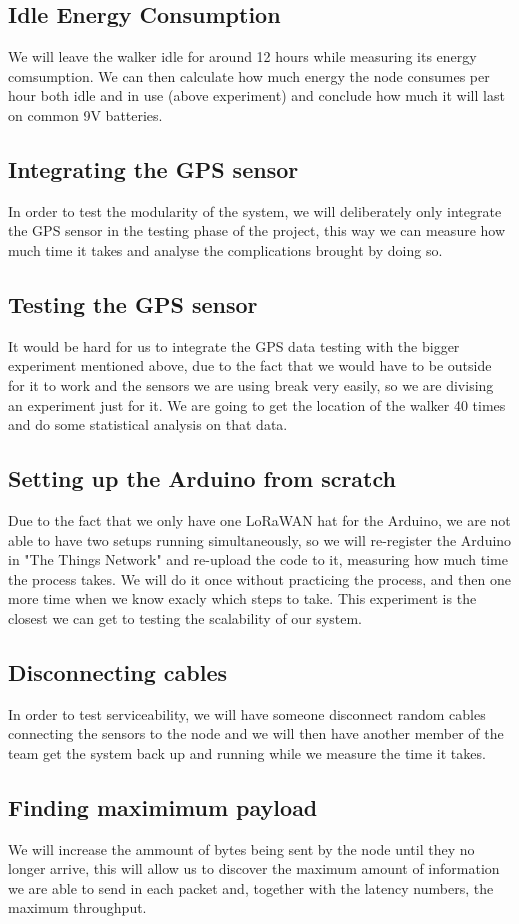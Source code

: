 	\subsection{Idle Energy Consumption}
		We will leave the walker idle for around 12 hours while measuring its energy comsumption.
		We can then calculate how much energy the node consumes per hour both idle and in use (above experiment) and conclude how much it will last on common 9V batteries.

	\subsection{Integrating the GPS sensor}
		In order to test the modularity of the system, we will deliberately only integrate the GPS sensor in the testing phase of the project, this way we can measure how much time it takes and analyse the complications brought by doing so.

	\subsection{Testing the GPS sensor}
		It would be hard for us to integrate the GPS data testing with the bigger experiment mentioned above, due to the fact that we would have to be outside for it to work and the sensors we are using break very easily, so we are divising an experiment just for it.
		We are going to get the location of the walker 40 times and do some statistical analysis on that data.

	\subsection{Setting up the Arduino from scratch}
		Due to the fact that we only have one LoRaWAN hat for the Arduino, we are not able to have two setups running simultaneously, so we will re-register the Arduino in "The Things Network" and re-upload the code to it, measuring how much time the process takes. We will do it once without practicing the process, and then one more time when we know exacly which steps to take. This experiment is the closest we can get to testing the scalability of our system.

	\subsection{Disconnecting cables}
		In order to test serviceability, we will have someone disconnect random cables connecting the sensors to the node and we will then have another member of the team get the system back up and running while we measure the time it takes.

	\subsection{Finding maximimum payload}
		We will increase the ammount of bytes being sent by the node until they no longer arrive, this will allow us to discover the maximum amount of information we are able to send in each packet and, together with the latency numbers, the maximum throughput.

